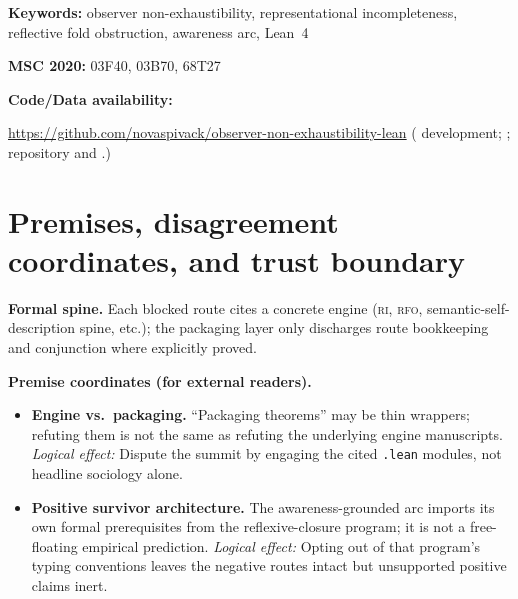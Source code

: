 \documentclass[11pt]{article}
\theoremstyle{plain}
\theoremstyle{definition}
\theoremstyle{remark}
\newcommand{\RI}{\textsc{ri}}
\newcommand{\RFO}{\textsc{rfo}}
\begin{document}
\begin{abstract}
\textbf{Trust boundary:} Route classification bundles theorems proved in distinct Lean corpora (representational incompleteness, reflective fold obstruction, awareness arc); synthesis language coordinates them but does not collapse their independent hypotheses.

\NovaZenodoInAbstract
\end{abstract}

\noindent\textbf{Keywords:} observer non-exhaustibility, representational incompleteness,
reflective fold obstruction, awareness arc, Lean~4

\noindent\textbf{MSC 2020:} 03F40, 03B70, 68T27

\noindent\textbf{Code/Data availability:}\newline
\begingroup\raggedright
\url{https://github.com/novaspivack/observer-non-exhaustibility-lean}\linebreak
( development; ; repository  and .)
\par\endgroup

\section{Premises, disagreement coordinates, and trust boundary}\label{sec:premises-one-flagship}
\begin{keybox}[title=Where disagreement can (and cannot) live]
\textbf{Formal spine.}
Each blocked route cites a concrete engine (\RI{}, \RFO{}, semantic-self-description spine, etc.); the packaging layer only discharges route bookkeeping and conjunction where explicitly proved.

\medskip
\textbf{Premise coordinates (for external readers).}
\begin{itemize}[leftmargin=2em]
\item \textbf{Engine vs.\ packaging.} ``Packaging theorems'' may be thin wrappers; refuting them is not the same as refuting the underlying engine manuscripts.
  \emph{Logical effect:} Dispute the summit by engaging the cited \texttt{.lean} modules, not headline sociology alone.
\item \textbf{Positive survivor architecture.} The awareness-grounded arc imports its own formal prerequisites from the reflexive-closure program; it is not a free-floating empirical prediction.
  \emph{Logical effect:} Opting out of that program's typing conventions leaves the negative routes intact but unsupported positive claims inert.
\end{itemize}
\end{keybox}
\end{document}
